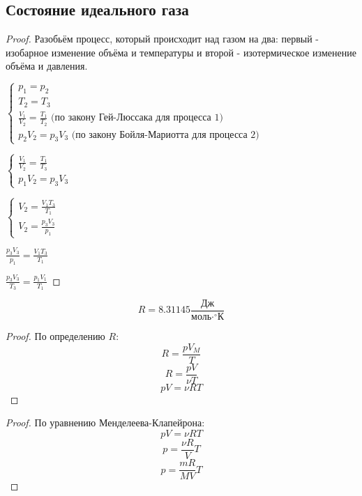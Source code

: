 \subsection{Состояние идеального газа}
\begin{proof}
	Разобьём процесс, который происходит над газом на два: первый - изобарное изменение объёма и температуры и второй - изотермическое изменение объёма и давления.\par
	$\displaystyle \begin{cases}
		p_1 = p_2 \\
		T_2 = T_3 \\
		\frac{V_1}{V_2}=\frac{T_1}{T_2} \text{ (по закону Гей-Люссака для процесса 1)} \\
		p_2 V_2 = p_3 V_3 \text{ (по закону Бойля-Мариотта для процесса 2)}
	\end{cases}$\par\medskip
	$\displaystyle \begin{cases}
		\frac{V_1}{V_2}=\frac{T_1}{T_3} \\
		p_1 V_2 = p_3 V_3
	\end{cases}$\par\medskip
	$\displaystyle \begin{cases}
		V_2=\frac{V_1 T_3}{T_1} \\
		V_2=\frac{p_3 V_3}{p_1}
	\end{cases}$\par\medskip
	$\displaystyle \frac{p_3 V_3}{p_1}=\frac{V_1 T_3}{T_1}$\par\medskip
	$\displaystyle \frac{p_3 V_3}{T_3}=\frac{p_1 V_1}{T_1}$\par
\end{proof}

\[R = 8.31145 \textstyle \frac{\text{Дж}}{\text{моль} \cdot ^\circ \text{К}}\]

\begin{proof}
	По определению $R$:
	\[R=\frac{pV_M}{T}\]
	\[R=\frac{pV}{\nu T}\]
	\[pV = \nu R T\]
\end{proof}

\begin{proof}
	По уравнению Менделеева-Клапейрона:
	\[pV=\nu R T\]
	\[p=\frac{\nu R}{V} T\]
	\[p=\frac{m R}{M V} T\]
\end{proof}